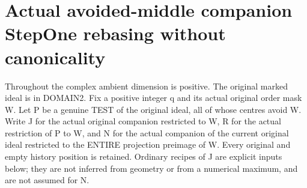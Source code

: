 \section{Actual avoided-middle companion StepOne rebasing without canonicality}

Throughout the complex ambient dimension is positive. The original marked
ideal is in DOMAIN2. Fix a positive integer q and its actual original order
mask W. Let P be a genuine TEST of the original ideal, all of whose centres
avoid W. Write J for the actual original companion restricted to W, R for
the actual restriction of P to W, and N for the actual companion of the
current original ideal restricted to the ENTIRE projection preimage of W.
Every original and empty history position is retained. Ordinary recipes
of J are explicit inputs below; they are not inferred from geometry or
from a numerical maximum, and are not assumed for N.

